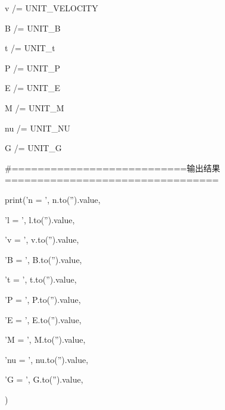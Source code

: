 v   /= UNIT\_VELOCITY

B   /= UNIT\_B

t   /= UNIT\_t

P   /= UNIT\_P

E   /= UNIT\_E

M   /= UNIT\_M

nu  /= UNIT\_NU

G   /= UNIT\_G

\#===========================输出结果=================================

print('n = ', n.to('').value,

      'l = ', l.to('').value,

      'v = ', v.to('').value,

      'B = ', B.to('').value,

      't = ', t.to('').value,

      'P = ', P.to('').value,

      'E = ', E.to('').value,

      'M = ', M.to('').value,

      'nu = ', nu.to('').value,

      'G = ', G.to('').value,

      )
